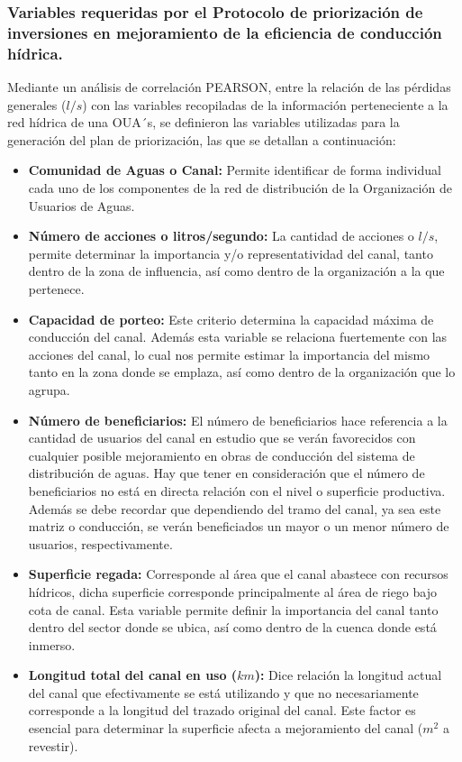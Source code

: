 \documentclass[]{article}
\begin{document}
\subsubsection{Variables requeridas por el Protocolo de priorización de inversiones en mejoramiento de la eficiencia de conducción hídrica.}

Mediante un análisis de correlación PEARSON, entre la relación de las pérdidas generales ($l/s$) con las variables recopiladas de la información perteneciente a la red hídrica de una OUA´s, se definieron las variables utilizadas para la generación del plan de priorización, las que se detallan a continuación:

\begin{itemize}
\item \textbf{Comunidad de Aguas o Canal:} Permite identificar de forma individual cada uno de los componentes de la red de distribución de la Organización de Usuarios de Aguas.
\item \textbf{Número de acciones o litros/segundo:} La cantidad de acciones o $l/s$, permite determinar la importancia y/o representatividad del canal, tanto dentro de la zona de influencia, así como dentro de la organización a la que pertenece.
\item \textbf{Capacidad de porteo:} Este criterio determina la capacidad máxima de conducción del canal. Además esta variable se relaciona fuertemente con las acciones del canal, lo cual nos permite estimar la importancia del mismo tanto en la zona donde se emplaza, así como dentro de la organización que lo agrupa.
\item \textbf{Número de beneficiarios:} El número de beneficiarios hace referencia a la cantidad de usuarios del canal en estudio que se verán favorecidos con cualquier posible mejoramiento en obras de conducción del sistema de distribución de aguas. Hay que tener en consideración que el número de beneficiarios no está en directa relación con el nivel o superficie productiva. Además se debe recordar que dependiendo del tramo del canal, ya sea este matriz o conducción, se verán beneficiados un mayor o un menor número de usuarios, respectivamente.
\item \textbf{Superficie regada:} Corresponde al área que el canal abastece con recursos hídricos, dicha superficie corresponde principalmente al área de riego bajo cota de canal. Esta variable permite definir la importancia del canal tanto dentro del sector donde se ubica, así como dentro de la cuenca donde está inmerso.
\item \textbf{Longitud total del canal en uso ($km$):} Dice relación la longitud actual del canal que efectivamente se está utilizando y que no necesariamente corresponde a la longitud del trazado original del canal. Este factor es esencial para determinar la superficie afecta a mejoramiento del canal ($m^2$ a revestir).

\end{itemize}
\end{document}
